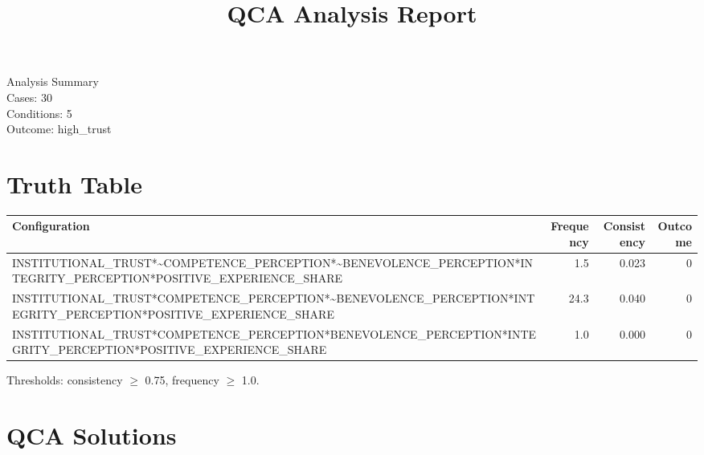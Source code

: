\documentclass[12pt,a4paper]{article}
\title{QCA Analysis Report}
\begin{document}
\maketitle
\begin{center}
\large
Analysis Summary \\
Cases: 30 \\
Conditions: 5 \\
Outcome: high\_trust
\end{center}
\newpage

\tableofcontents

\newpage


\section{Truth Table}
\begin{longtable}{lrrr}
\toprule
Configuration & Frequency & Consistency & Outcome \\
\midrule
    INSTITUTIONAL\_TRUST*\textasciitilde{}COMPETENCE\_PERCEPTION*\textasciitilde{}BENEVOLENCE\_PERCEPTION*INTEGRITY\_PERCEPTION*POSITIVE\_EXPERIENCE\_SHARE & 1.5 & 0.023 & 0 \\
    INSTITUTIONAL\_TRUST*COMPETENCE\_PERCEPTION*\textasciitilde{}BENEVOLENCE\_PERCEPTION*INTEGRITY\_PERCEPTION*POSITIVE\_EXPERIENCE\_SHARE & 24.3 & 0.040 & 0 \\
    INSTITUTIONAL\_TRUST*COMPETENCE\_PERCEPTION*BENEVOLENCE\_PERCEPTION*INTEGRITY\_PERCEPTION*POSITIVE\_EXPERIENCE\_SHARE & 1.0 & 0.000 & 0 \\
\bottomrule
\end{longtable}

Thresholds: consistency $\geq$ 0.75, frequency $\geq$ 1.0.


\section{QCA Solutions}
\end{document}
